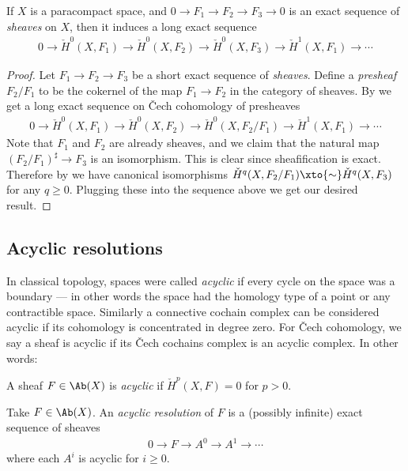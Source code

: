 \documentclass[11pt]{book}
\begin{document}
\begin{proposition}\label{prop:LES-Cech-cohomology}
If $X$ is a paracompact space, and $0 \to F_1 \to F_2 \to F_3 \to 0$ is an exact sequence of \emph{sheaves} on $X$, then it induces a long exact sequence
\begin{align*}
    0 \to \check{H}^0(X,F_1) \to \check{H}^0(X,F_2) \to \check{H}^0(X,F_3) \to \check{H}^1(X,F_1) \to \cdots
\end{align*}
\end{proposition}
\begin{proof} Let $F_1 \to F_2 \to F_3$ be a short exact sequence of \emph{sheaves}. Define a \emph{presheaf} $F_2/F_1$ to be the cokernel of the map $F_1 \to F_2$ in the category of sheaves. By  we get a long exact sequence on \v{C}ech cohomology of presheaves
\begin{align*}
    0 \to \check{H}^0(X,F_1) \to \check{H}^0(X,F_2) \to \check{H}^0(X, F_2/F_1) \to \check{H}^1(X,F_1) \to \cdots 
\end{align*}
Note that $F_1$ and $F_2$ are already sheaves, and we claim that the natural map $(F_2/F_1)^\sharp \to F_3$ is an isomorphism. This is clear since sheafification is exact. Therefore by  we have canonical isomorphisms $\check{H}^q(X,F_2/F_1) \xto{\sim} \check{H}^q(X,F_3)$ for any $q\ge0$. Plugging these into the sequence above we get our desired result.
\end{proof}

\subsection{Acyclic resolutions}

In classical topology, spaces were called \emph{acyclic} if every cycle on the space was a boundary --- in other words the space had the homology type of a point or any contractible space. Similarly a connective cochain complex can be considered acyclic if its cohomology is concentrated in degree zero. For \v{C}ech cohomology, we say a sheaf is acyclic if its \v{C}ech cochains complex is an acyclic complex. In other words:

\begin{definition}\label{def:acyclic-sheaf} A sheaf $F\in \Ab(X)$ is \emph{acyclic} if $\check{H}^p(X,F) = 0$ for $p>0$.
\end{definition}

\begin{definition} Take $F\in \Ab(X)$. An \emph{acyclic resolution} of $F$ is a (possibly infinite) exact sequence of sheaves
\begin{align*}
    0 \to F \to A^0 \to A^1 \to \cdots
\end{align*}
where each $A^i$ is acyclic for $i\ge 0$.
\end{definition}
\end{document}
